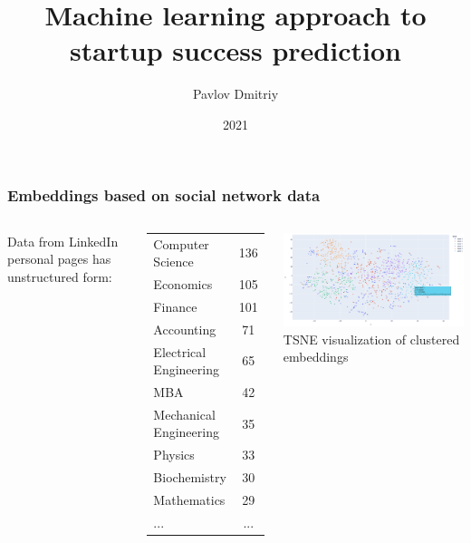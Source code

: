 \documentclass[8pt]{beamer}
\title{\huge{Machine learning approach to startup success prediction}}
\author{Pavlov Dmitriy}
\institute{Moscow Institute of Physics and Technology}
\date{2021}
\begin{document}


\begin{frame}
    \frametitle{Embeddings based on social network data}
    
    
    
    \begin{columns}
        
        Data from LinkedIn personal pages has unstructured form:
        
        \begin{center}
            \begin{tabular}{ l c }
            Computer Science                                  & 136 \\
            Economics                                         & 105 \\ 
            Finance                                           & 101 \\
            Accounting                                        &  71 \\ 
            Electrical Engineering                            &  65 \\ 
            MBA   &  42 \\ 
            Mechanical Engineering                            &  35 \\ 
            Physics                                           &  33 \\ 
            Biochemistry                                      &  30 \\ 
            Mathematics                                       &  29 \\
            ...                                               & ... \\
            \end{tabular}
        \end{center}
    
    
       \includegraphics[width=7cm]{figures/paper/kMeans-16-03.png}
        TSNE visualization of clustered embeddings
    \end{columns}
    
\end{frame}


\end{document}
